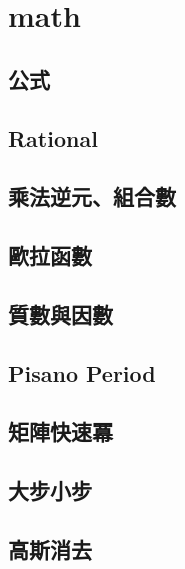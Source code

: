 \section{math}
    \subsection{公式}
        
    \subsection{Rational}
        
    \subsection{乘法逆元、組合數}
        
    \subsection{歐拉函數}
         \columnbreak
    \subsection{質數與因數}
        
    \subsection{Pisano Period}
        
    \subsection{矩陣快速冪}
        
    \subsection{大步小步}
         \columnbreak
    \subsection{高斯消去}
        
\clearpage

